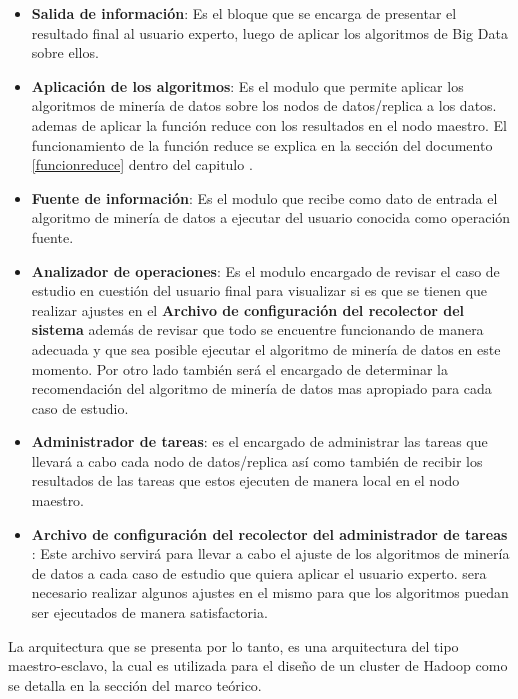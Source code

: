\begin{itemize}
	\item \textbf{Salida de información}: Es el bloque que se encarga de presentar el resultado final al usuario experto, luego de aplicar los algoritmos de Big Data sobre ellos.
	\item \textbf{Aplicación de los algoritmos}: Es el modulo que permite aplicar los algoritmos de minería de datos sobre los nodos de datos/replica a los datos. ademas de aplicar la función reduce con los resultados en el nodo maestro.
	El funcionamiento de la función reduce se explica en la sección del documento \ref{funcionreduce} dentro del capitulo .
	\item \textbf{Fuente de información}: Es el modulo que recibe como dato de entrada el algoritmo de minería de datos a ejecutar del usuario conocida como operación fuente.
	\item \textbf{Analizador de operaciones}: Es el modulo encargado de revisar el caso de estudio en cuestión del usuario final para visualizar si es que se tienen que realizar ajustes en el \textbf{Archivo de configuración del recolector del sistema} además de revisar que todo se encuentre funcionando de manera adecuada y que sea posible ejecutar el algoritmo de minería de datos en este momento.
	Por otro lado también será el encargado de determinar la recomendación del algoritmo de minería de datos mas apropiado para cada caso de estudio.
	\item \textbf{Administrador de tareas}: es el encargado de administrar las tareas que llevará a cabo cada nodo de datos/replica así como también de recibir los resultados de las tareas que estos ejecuten de manera local en el nodo maestro.
	\item \textbf{Archivo de configuración del recolector del administrador de tareas }: Este archivo servirá para llevar a cabo el ajuste de los algoritmos de minería de datos a cada caso de estudio que quiera aplicar el usuario experto. sera necesario realizar algunos ajustes en el mismo para que los algoritmos puedan ser ejecutados de manera satisfactoria.
\end{itemize}
La arquitectura que se presenta por lo tanto, es una arquitectura del tipo maestro-esclavo, la cual es utilizada para el diseño de un cluster de Hadoop como se detalla en la sección  del marco teórico. 